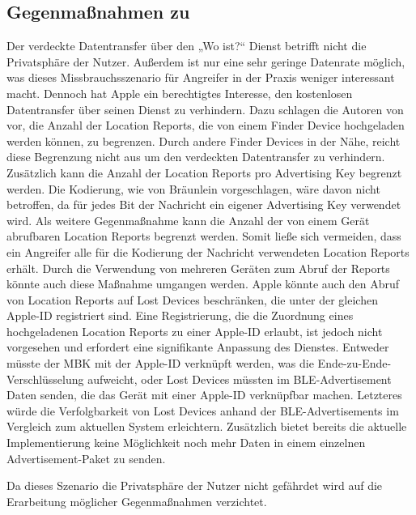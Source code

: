 \subsection{Gegenmaßnahmen zu }
Der verdeckte Datentransfer über den „Wo ist?“ Dienst betrifft nicht die Privatsphäre der Nutzer.
Außerdem ist nur eine sehr geringe Datenrate möglich, was dieses Missbrauchsszenario für Angreifer in der Praxis weniger interessant macht.
Dennoch hat Apple ein berechtigtes Interesse, den kostenlosen Datentransfer über seinen Dienst zu verhindern.
Dazu schlagen die Autoren von \cite{Tonetto_FindMy} vor, die Anzahl der Location Reports, die von einem Finder Device hochgeladen werden können, zu begrenzen.
Durch andere Finder Devices in der Nähe, reicht diese Begrenzung nicht aus um den verdeckten Datentransfer zu verhindern.
Zusätzlich kann die Anzahl der Location Reports pro Advertising Key begrenzt werden.
Die Kodierung, wie von Bräunlein \cite{braeunlein_sendmy} vorgeschlagen, wäre davon nicht betroffen, da für jedes Bit der Nachricht ein eigener Advertising Key verwendet wird.
Als weitere Gegenmaßnahme kann die Anzahl der von einem Gerät abrufbaren Location Reports begrenzt werden.
Somit ließe sich vermeiden, dass ein Angreifer alle für die Kodierung der Nachricht verwendeten Location Reports erhält.
Durch die Verwendung von mehreren Geräten zum Abruf der Reports könnte auch diese Maßnahme umgangen werden.
Apple könnte auch den Abruf von Location Reports auf Lost Devices beschränken, die unter der gleichen Apple-ID registriert sind.
Eine Registrierung, die die Zuordnung eines hochgeladenen Location Reports zu einer Apple-ID erlaubt, ist jedoch nicht vorgesehen und erfordert eine signifikante Anpassung des Dienstes.
Entweder müsste der \ac{MBK} mit der Apple-ID verknüpft werden, was die Ende-zu-Ende-Verschlüsselung aufweicht, oder Lost Devices müssten im \ac{BLE}-Advertisement Daten senden, die das Gerät mit einer Apple-ID verknüpfbar machen.
Letzteres würde die Verfolgbarkeit von Lost Devices anhand der \ac{BLE}-Advertisements im Vergleich zum aktuellen System erleichtern.
Zusätzlich bietet bereits die aktuelle Implementierung keine Möglichkeit noch mehr Daten in einem einzelnen Advertisement-Paket zu senden.

Da dieses Szenario die Privatsphäre der Nutzer nicht gefährdet wird auf die Erarbeitung möglicher Gegenmaßnahmen verzichtet.

